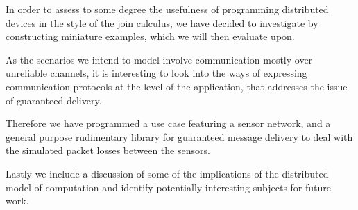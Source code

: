 
In order to assess to some degree the usefulness of programming distributed
devices in the style of the join calculus, we have decided to investigate by
constructing miniature examples, which we will then evaluate upon.

As the scenarios we intend to model involve communication mostly over
unreliable channels, it is interesting to look into the ways of
expressing communication protocols at the level of the application,
that addresses the issue of guaranteed delivery.

Therefore we have programmed a use case featuring a sensor network,
and a general purpose rudimentary library for guaranteed message
delivery to deal with the simulated packet losses between the sensors.

Lastly we include a discussion of some of the implications of the distributed
model of computation and identify potentially interesting subjects for future
work.




